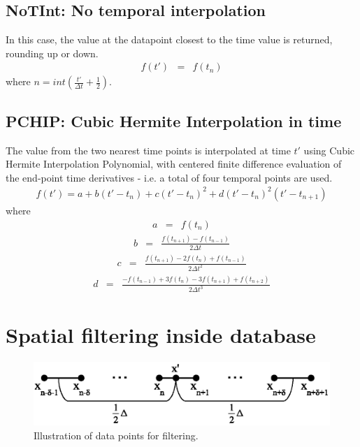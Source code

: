 \documentclass[11pt]{article}
\def\bea{\begin{eqnarray}}
\def\eea{\end{eqnarray}}
\begin{document}
\subsection*{NoTInt: No temporal interpolation}

In this case, the value at the datapoint closest to the time value
is returned, rounding up or down. \bea f(t') &=& f(t_n)\eea where
$n=int(\frac{t'}{\Delta t}+\frac{1}{2})$.

\subsection*{PCHIP: Cubic Hermite Interpolation in time}

The value from the two nearest time points is interpolated at time $t'$
using Cubic Hermite Interpolation Polynomial, with centered finite
difference evaluation of the end-point time derivatives - i.e. a
total of four temporal points are used. \bea
f(t')=a+b(t'-t_n)+c(t'-t_n)^2+d(t'-t_n)^2(t'-t_{n+1}) \eea where
\bea a &=& f(t_n)\nonumber\eea \bea b &=&
\frac{f(t_{n+1})-f(t_{n-1})}{2\Delta t}\nonumber\eea \bea c &=&
\frac{f(t_{n+1})-2f(t_n)+f(t_{n-1})}{2\Delta t^2}\nonumber\eea
\bea d &=&
\frac{-f(t_{n-1})+3f(t_n)-3f(t_{n+1})+f(t_{n+2})}{2\Delta t^3}
\nonumber\eea

\section{Spatial filtering inside database} 

\begin{figure}[ht]
\begin{minipage}{\linewidth}
\centering\includegraphics[width=0.8\linewidth]{Filtering.eps}
\end{minipage} \caption{Illustration of data points for filtering.}\label{filtering}
\end{figure}
\end{document}
